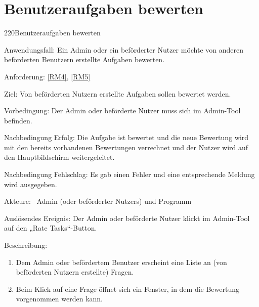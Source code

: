 \section{Benutzeraufgaben bewerten}
\begin{function}{220}{Benutzeraufgaben bewerten}
\item[Anwendungsfall:] Ein Admin oder ein beförderter Nutzer möchte von anderen beförderten Benutzern erstellte Aufgaben bewerten.
\item[Anforderung:] \ref{RM4}, \ref{RM5}
\item[Ziel:] Von beförderten Nutzern erstellte Aufgaben sollen bewertet werden.
\item[Vorbedingung:] Der Admin oder beförderte Nutzer muss sich im Admin-Tool befinden.
\item[Nachbedingung Erfolg:]  Die Aufgabe ist bewertet und die neue Bewertung wird mit den bereits vorhandenen Bewertungen verrechnet und der Nutzer wird auf den Hauptbildschirm weitergeleitet.
\item[Nachbedingung Fehlschlag:] Es gab einen Fehler und eine entsprechende Meldung wird ausgegeben. 
\item[Akteure:] ~Admin (oder beförderter Nutzers) und Programm
\item[Auslösendes Ereignis:] Der Admin oder beförderte Nutzer klickt im Admin-Tool auf den „Rate Tasks“-Button.
\item[Beschreibung:] ~
\begin{enumerate}
  \item  Dem Admin oder befördertem Benutzer erscheint eine Liste an (von beförderten Nutzern erstellte) Fragen.
  \item  Beim Klick auf eine Frage öffnet sich ein Fenster, in dem die Bewertung vorgenommen werden kann.
\end{enumerate}
\end{function}


